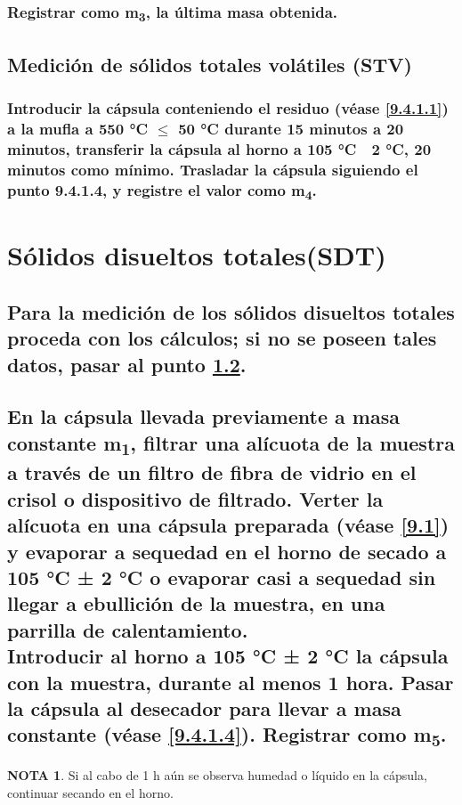 \documentclass[spanish,12pt,letterpaper,titlepage]{article}
\theoremstyle{definition}
\newtheorem{teor}{NOTA}
\begin{document}
	\subsubsection{Registrar como m\textsubscript{3}, la última masa obtenida.}\label{9.4.1.5}
	\subsection{Medición de sólidos totales volátiles (STV)}\label{9.4.2}
	\subsubsection{Introducir la cápsula conteniendo el residuo (véase \ref{9.4.1.1}) a la mufla a 550 °C $\leq$ 50 °C durante 15 minutos a 20 minutos, transferir la cápsula al horno a 105 °C  2 °C, 20 minutos como mínimo. Trasladar la cápsula siguiendo el punto 9.4.1.4, y registre el valor como m\textsubscript{4}.}\label{9.4.2.1}
	\section{Sólidos disueltos totales(SDT)}\label{9.5}
	\subsection{Para la medición de los sólidos disueltos totales proceda con los cálculos; si no se poseen tales datos, pasar al punto \ref{9.5.2}.}\label{9.5.1}
	\subsection{En la cápsula llevada previamente a masa constante m\textsubscript{1}, filtrar una alícuota de la muestra a través de un filtro de fibra de vidrio en el crisol o dispositivo de filtrado. Verter la alícuota en una cápsula preparada (véase \ref{9.1}) y evaporar a sequedad en el horno de secado a 105 °C ± 2 °C o evaporar casi a sequedad sin llegar a ebullición de la muestra, en una parrilla de calentamiento.\vspace{12pt}\\Introducir al horno a 105 °C ± 2 °C la cápsula con la muestra, durante al menos 1 hora. Pasar la cápsula al desecador para llevar a masa constante (véase \ref{9.4.1.4}). Registrar como m\textsubscript{5}.}\label{9.5.2}
	\begin{teor}
		Si al cabo de 1 h aún se observa humedad o líquido en la cápsula, continuar secando en el horno.
	\end{teor}
\end{document}
